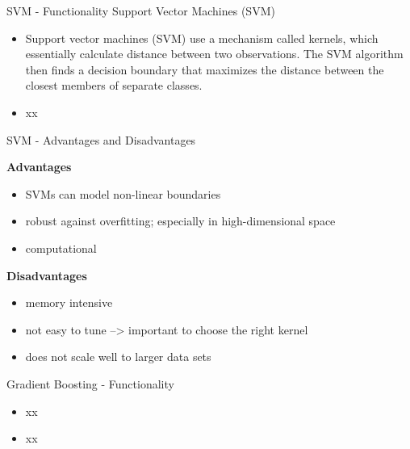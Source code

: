 \documentclass[11pt,compress,t,notes=noshow, xcolor=table]{beamer}
\begin{document}

\begin{frame}{SVM - Functionality}
Support Vector Machines (SVM)
\begin{itemize}
\item Support vector machines (SVM) use a mechanism called kernels, which essentially calculate distance between two observations. The SVM algorithm then finds a decision boundary that maximizes the distance between the closest members of separate classes.
\item xx
\end{itemize}


\end{frame}

\begin{frame}{SVM - Advantages and Disadvantages}

\textbf{Advantages}
\begin{itemize}
\item SVMs can model non-linear boundaries
\item robust against overfitting; especially in high-dimensional space
\item computational 
\end{itemize}


\textbf{Disadvantages}
\begin{itemize}
\item memory intensive
\item not easy to tune --> important to choose the right kernel 
\item does not scale well to larger data sets
\end{itemize}
\end{frame}



\begin{frame}{Gradient Boosting - Functionality}

\begin{itemize}
\item xx
\item xx
\end{itemize}


\end{frame}
\end{document}
